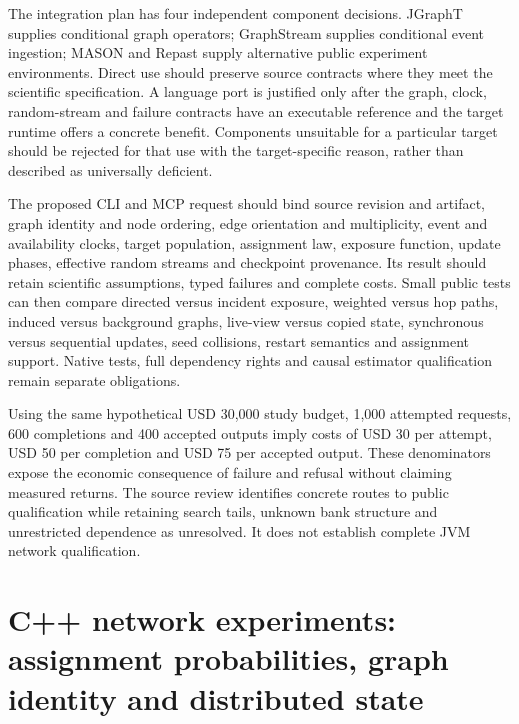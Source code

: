 The integration plan has four independent component decisions. JGraphT supplies conditional graph operators; GraphStream supplies conditional event ingestion; MASON and Repast supply alternative public experiment environments. Direct use should preserve source contracts where they meet the scientific specification. A language port is justified only after the graph, clock, random-stream and failure contracts have an executable reference and the target runtime offers a concrete benefit. Components unsuitable for a particular target should be rejected for that use with the target-specific reason, rather than described as universally deficient.~\citep{exec25_jnet_choice}

The proposed CLI and MCP request should bind source revision and artifact, graph identity and node ordering, edge orientation and multiplicity, event and availability clocks, target population, assignment law, exposure function, update phases, effective random streams and checkpoint provenance. Its result should retain scientific assumptions, typed failures and complete costs. Small public tests can then compare directed versus incident exposure, weighted versus hop paths, induced versus background graphs, live-view versus copied state, synchronous versus sequential updates, seed collisions, restart semantics and assignment support. Native tests, full dependency rights and causal estimator qualification remain separate obligations.~\citep{exec25_jnet_choice}

Using the same hypothetical USD 30,000 study budget, 1,000 attempted requests, 600 completions and 400 accepted outputs imply costs of USD 30 per attempt, USD 50 per completion and USD 75 per accepted output. These denominators expose the economic consequence of failure and refusal without claiming measured returns. The source review identifies concrete routes to public qualification while retaining search tails, unknown bank structure and unrestricted dependence as unresolved. It does not establish complete JVM network qualification.~\citep{exec25_jnet_choice}


\section[C++ network experiments]{C++ network experiments: assignment probabilities, graph identity and distributed state}
\label{sec:exec25-cxx-network}

